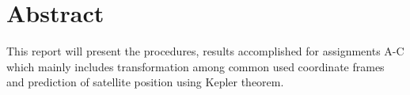 \chapter{Abstract}
This report will present the procedures, results accomplished for assignments A-C which mainly includes transformation among common used coordinate frames and prediction of satellite position using Kepler theorem.